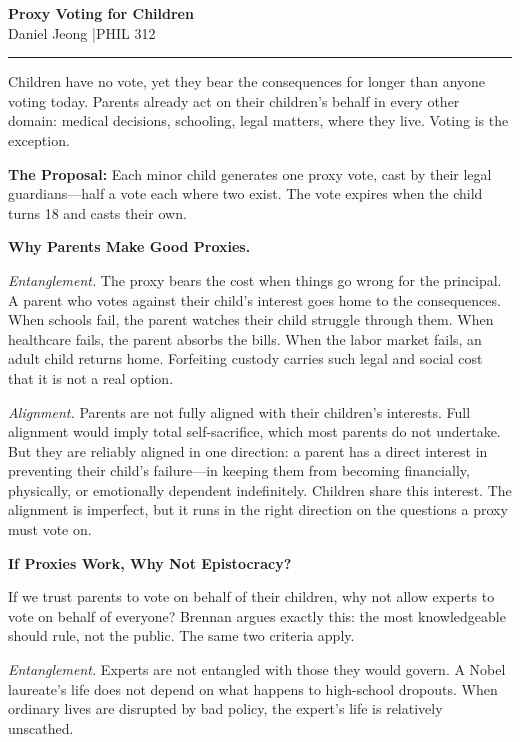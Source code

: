 \documentclass[11pt]{article}
\begin{document}
\begin{center}
    {\large \textbf{Proxy Voting for Children}}\\[3pt]
    Daniel Jeong \quad|\quad PHIL 312
\end{center}

\vspace{-3pt}
\rule{\textwidth}{0.4pt}

Children have no vote, yet they bear the consequences for longer than anyone voting today. Parents already act on their children's behalf in every other domain: medical decisions, schooling, legal matters, where they live. Voting is the exception.

\textbf{The Proposal:} Each minor child generates one proxy vote, cast by their legal guardians---half a vote each where two exist. The vote expires when the child turns 18 and casts their own.

\textbf{Why Parents Make Good Proxies.}

\textit{Entanglement.} The proxy bears the cost when things go wrong for the principal. A parent who votes against their child's interest goes home to the consequences. When schools fail, the parent watches their child struggle through them. When healthcare fails, the parent absorbs the bills. When the labor market fails, an adult child returns home. Forfeiting custody carries such legal and social cost that it is not a real option.

\textit{Alignment.} Parents are not fully aligned with their children's interests. Full alignment would imply total self-sacrifice, which most parents do not undertake. But they are reliably aligned in one direction: a parent has a direct interest in preventing their child's failure---in keeping them from becoming financially, physically, or emotionally dependent indefinitely. Children share this interest. The alignment is imperfect, but it runs in the right direction on the questions a proxy must vote on.

\textbf{If Proxies Work, Why Not Epistocracy?}

If we trust parents to vote on behalf of their children, why not allow experts to vote on behalf of everyone? Brennan argues exactly this: the most knowledgeable should rule, not the public. The same two criteria apply.

\textit{Entanglement.} Experts are not entangled with those they would govern. A Nobel laureate's life does not depend on what happens to high-school dropouts. When ordinary lives are disrupted by bad policy, the expert's life is relatively unscathed.
\end{document}
